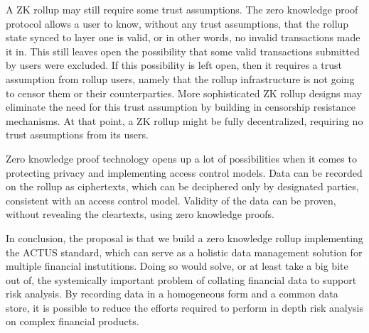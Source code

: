 \documentclass[11pt]{article}
\begin{document}
A ZK rollup may still require some trust assumptions. The zero knowledge proof
protocol allows a user to know, without any trust assumptions, that the rollup
state synced to layer one is valid, or in other words, no invalid transactions
made it in. This still leaves open the possibility that some valid transactions
submitted by users were excluded. If this possibility is left open, then it requires
a trust assumption from rollup users, namely that the rollup infrastructure is
not going to censor them or their counterparties. More sophisticated ZK rollup
designs may eliminate the need for this trust assumption by building in censorship
resistance mechanisms. At that point, a ZK rollup might be fully decentralized,
requiring no trust assumptions from its users.

Zero knowledge proof technology opens up a lot of possibilities when it comes
to protecting privacy and implementing access control models. Data can be recorded
on the rollup as ciphertexts, which can be deciphered only by designated parties,
consistent with an access control model. Validity of the data can be proven,
without revealing the cleartexts, using zero knowledge proofs.

In conclusion, the proposal is that we build a zero knowledge rollup implementing
the ACTUS standard, which can serve as a holistic data management solution for
multiple financial instutitions. Doing so would solve, or at least take a big
bite out of, the systemically important problem of collating financial data
to support risk analysis. By recording data in a homogeneous form and a common
data store, it is possible to reduce the efforts required to perform in depth
risk analysis on complex financial products.
\end{document}
